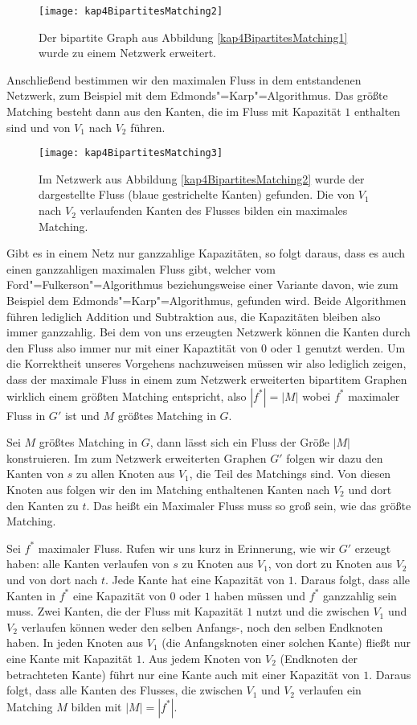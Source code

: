 \begin{figure}[htb]
  \centering
  \texttt{[image: kap4BipartitesMatching2]}
  \caption{Der bipartite Graph aus Abbildung \vref{kap4BipartitesMatching1} wurde zu einem Netzwerk erweitert.}
  \label{kap4BipartitesMatching2}
\end{figure}


Anschließend bestimmen wir den maximalen Fluss in dem entstandenen Netzwerk, zum Beispiel mit dem Edmonds"=Karp"=Algorithmus. Das größte Matching besteht dann aus den Kanten, die im Fluss mit Kapazität $1$ enthalten sind und von $V_1$ nach $V_2$ führen.

\begin{figure}[htb]
  \centering
  \texttt{[image: kap4BipartitesMatching3]}
  \caption{Im Netzwerk aus Abbildung \vref{kap4BipartitesMatching2} wurde der dargestellte Fluss (blaue gestrichelte Kanten) gefunden. Die von $V_1$ nach $V_2$ verlaufenden Kanten des Flusses bilden ein maximales Matching.}
  \label{kap4BipartitesMatching3}
\end{figure}

Gibt es in einem Netz nur ganzzahlige Kapazitäten, so folgt daraus, dass es auch einen ganzzahligen maximalen Fluss gibt, welcher vom Ford"=Fulkerson"=Algorithmus beziehungsweise einer Variante davon, wie zum Beispiel dem Edmonds"=Karp"=Algorithmus, gefunden wird. Beide Algorithmen führen lediglich Addition und Subtraktion aus, die Kapazitäten bleiben also immer ganzzahlig. Bei dem von uns erzeugten Netzwerk können die Kanten durch den Fluss also immer nur mit einer Kapaztität von $0$ oder $1$ genutzt werden. Um die Korrektheit unseres Vorgehens nachzuweisen müssen wir also lediglich zeigen, dass der maximale Fluss in einem zum Netzwerk erweiterten bipartitem Graphen wirklich einem größten Matching entspricht, also $|f^*| = |M|$ wobei $f^*$ maximaler Fluss in $G'$ ist und $M$ größtes Matching in $G$.

Sei $M$ größtes Matching in $G$, dann lässt sich ein Fluss der Größe $|M|$ konstruieren. Im zum Netzwerk erweiterten Graphen $G'$ folgen wir dazu den Kanten von $s$ zu allen Knoten aus $V_1$, die Teil des Matchings sind. Von diesen Knoten aus folgen wir den im Matching enthaltenen Kanten nach $V_2$ und dort den Kanten zu $t$. Das heißt ein Maximaler Fluss muss so groß sein, wie das größte Matching.

Sei $f^*$ maximaler Fluss. Rufen wir uns kurz in Erinnerung, wie wir $G'$ erzeugt haben: alle Kanten verlaufen von $s$ zu Knoten aus $V_1$, von dort zu Knoten aus $V_2$ und von dort nach $t$. Jede Kante hat eine Kapazität von $1$. Daraus folgt, dass alle Kanten in $f^*$ eine Kapazität von $0$ oder $1$ haben müssen und $f^*$ ganzzahlig sein muss. Zwei Kanten, die der Fluss mit Kapazität $1$ nutzt und die zwischen $V_1$ und $V_2$ verlaufen können weder den selben Anfangs-, noch den selben Endknoten haben. In jeden Knoten aus $V_1$ (die Anfangsknoten einer solchen Kante) fließt nur eine Kante mit Kapazität $1$. Aus jedem Knoten von $V_2$ (Endknoten der betrachteten Kante) führt nur eine Kante auch mit einer Kapazität von $1$. Daraus folgt, dass alle Kanten des Flusses, die zwischen $V_1$ und $V_2$ verlaufen ein Matching $M$ bilden mit $|M| = |f^*|$.

